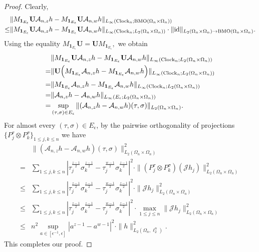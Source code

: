 \documentclass{amsart}
\numberwithin{equation}{section}
\theoremstyle{definition}
\theoremstyle{remark}
\newcommand{\1}{\mathbf 1}
\newcommand{\BMO}{\mathrm{BMO}}
\begin{document}
\begin{proof}
Clearly,
\begin{align*}
&\|M_{\1_{E_{\epsilon}}}\mathbf{U}\mathcal{A}_{n,z}h-M_{\1_{E_{\epsilon}}}\mathbf{U}\mathcal{A}_{n,w}h\|_{L_{\infty}({\rm Clock}_n;\BMO(\Omega_n\times\Omega_n))}\\
\leq & \|M_{\1_{E_{\epsilon}}}\mathbf{U}\mathcal{A}_{n,z}h-M_{\1_{E_{\epsilon}}}\mathbf{U}\mathcal{A}_{n,w}h\|_{L_{\infty}({\rm Clock}_n;L_2(\Omega_n\times\Omega_n))}\cdot\|{\rm id}\|_{L_2(\Omega_n\times\Omega_n)\to\BMO(\Omega_n\times\Omega_n)}.
\end{align*}
Using the equality $M_{\1_{E_{\epsilon}}}\mathbf{U}=\mathbf{U}M_{\1_{E_{\epsilon}}},$ we obtain
\begin{align*}
&\|M_{\1_{E_{\epsilon}}}\mathbf{U}\mathcal{A}_{n,z}h-M_{\1_{E_{\epsilon}}}\mathbf{U}\mathcal{A}_{n,w}h\|_{L_{\infty}({\rm Clock}_n;L_2(\Omega_n\times\Omega_n))}\\
=&\|\mathbf{U}\Big(M_{\1_{E_{\epsilon}}}\mathcal{A}_{n,z}h-M_{\1_{E_{\epsilon}}}\mathcal{A}_{n,w}h\Big)\|_{L_{\infty}({\rm Clock}_n;L_2(\Omega_n\times\Omega_n))}\\
=&\|M_{\1_{E_{\epsilon}}}\mathcal{A}_{n,z}h-M_{\1_{E_{\epsilon}}}\mathcal{A}_{n,w}h\|_{L_{\infty}({\rm Clock}_n;L_2(\Omega_n\times\Omega_n))}\\
=&\|\mathcal{A}_{n,z}h-\mathcal{A}_{n,w}h\|_{L_{\infty}(E_{\epsilon};L_2(\Omega_n\times\Omega_n))}\\
=&\sup_{(\tau,\sigma)\in E_{\epsilon}}\|(\mathcal{A}_{n,z}h-\mathcal{A}_{n,w}h)(\tau,\sigma)\|_{L_2(\Omega_n\times\Omega_n)}.
\end{align*}
For almost every $(\tau,\sigma)\in E_{\epsilon}$, by the pairwise orthogonality of projections $\{P^{\tau}_{j}\otimes P^{\sigma}_{k}\}_{1\leq j,k\leq n}$ we have
\begin{align*}
&\|(\mathcal{A}_{n,z}h-\mathcal{A}_{n,w}h)(\tau,\sigma)\|_{L_2(\Omega_n\times\Omega_n)}^2\\
=&\sum_{1\leq j,k\leq n}|\tau_j^{\frac{z-1}{2}}\sigma_k^{\frac{z-1}{2}}-\tau_j^{\frac{w-1}{2}}\sigma_k^{\frac{z-1}{2}}|^2\cdot \|(P_j^{\tau}\otimes P_k^{\sigma})(\mathcal{J}h_j)\|_{L_2(\Omega_n\times\Omega_n)}^{2}\\
\leq &\sum_{1\leq j,k\leq n}|\tau_j^{\frac{z-1}{2}}\sigma_k^{\frac{z-1}{2}}-\tau_j^{\frac{w-1}{2}}\sigma_k^{\frac{z-1}{2}}|^2\cdot \|\mathcal{J}h_j\|_{L_2(\Omega_n\times\Omega_n)}^2\\
\leq &\sum_{1\leq j,k\leq n}|\tau_j^{\frac{z-1}{2}}\sigma_k^{\frac{z-1}{2}}-\tau_j^{\frac{w-1}{2}}\sigma_k^{\frac{z-1}{2}}|^2\cdot \max_{1\leq j\leq n}\|\mathcal{J}h_j\|_{L_2(\Omega_n\times\Omega_n)}^{2}\\
\leq & n^2\sup_{a\in[\epsilon^{-1},\epsilon]}|a^{z-1}-a^{w-1}|^2\cdot\|h\|_{L_2(\Omega_n,\ell^{n}_{2})}^2.
\end{align*}
This completes our proof.
\end{proof}
\end{document}
